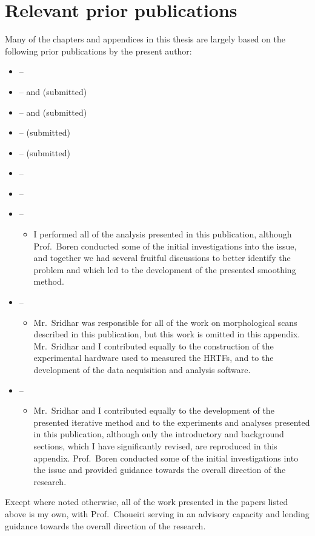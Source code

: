 \section{Relevant prior publications}
Many of the chapters and appendices in this thesis are largely based on the following prior publications by the present author:
\begin{itemize}
\item {} -- \citet{TylkaChoueiri2017a}
\item {} -- \citet{TylkaChoueiri2015} and \citet{TylkaChoueiri2019c} (submitted)
\item {} -- \citet{TylkaChoueiri2016} and \citet{TylkaChoueiri2019b} (submitted)
\item {} -- \citet{TylkaChoueiri2019d} (submitted)
\item {} -- \citet[section 6]{TylkaChoueiri2019b} (submitted)
\item {} -- \citet{TylkaChoueiri2019a}
\item {} -- \citet{TylkaChoueiri2017b}
\item {} -- \citet*{Tylka2017}
	\begin{itemize}
	\item I performed all of the analysis presented in this publication, although Prof.~Boren conducted some of the initial investigations into the issue, and together we had several fruitful discussions to better identify the problem and which led to the development of the presented smoothing method.
	\end{itemize}
\item {} -- \citet*{Sridhar2017}
	\begin{itemize}
	\item Mr.~Sridhar was responsible for all of the work on morphological scans described in this publication, but this work is omitted in this appendix.
	Mr.~Sridhar and I contributed equally to the construction of the experimental hardware used to measured the HRTFs, and to the development of the data acquisition and analysis software.
	\end{itemize}
\item {} -- \citet*{Tylka2014}
	\begin{itemize}
	\item Mr.~Sridhar and I contributed equally to the development of the presented iterative method and to the experiments and analyses presented in this publication, although only the introductory and background sections, which I have significantly revised, are reproduced in this appendix.
	Prof.~Boren conducted some of the initial investigations into the issue and provided guidance towards the overall direction of the research.
	\end{itemize}
\end{itemize}
Except where noted otherwise, all of the work presented in the papers listed above is my own, with Prof.~Choueiri serving in an advisory capacity and lending guidance towards the overall direction of the research.